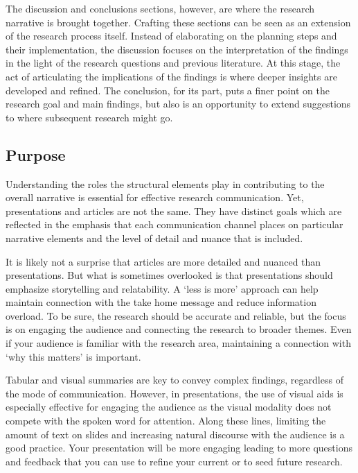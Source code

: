 \documentclass[
  letterpaper,
]{book}
\theoremstyle{definition}
\theoremstyle{remark}
\begin{document}
The discussion and conclusions sections, however, are where the research
narrative is brought together. Crafting these sections can be seen as an
extension of the research process itself. Instead of elaborating on the
planning steps and their implementation, the discussion focuses on the
interpretation of the findings in the light of the research questions
and previous literature. At this stage, the act of articulating the
implications of the findings is where deeper insights are developed and
refined. The conclusion, for its part, puts a finer point on the
research goal and main findings, but also is an opportunity to extend
suggestions to where subsequent research might go.

\subsection{Purpose}\label{sec-contribute-public-purpose}

Understanding the roles the structural elements play in contributing to
the overall narrative is essential for effective research communication.
Yet, presentations and articles are not the same. They have distinct
goals which are reflected in the emphasis that each communication
channel places on particular narrative elements and the level of detail
and nuance that is included.

It is likely not a surprise that articles are more detailed and nuanced
than presentations. But what is sometimes overlooked is that
presentations should emphasize storytelling and relatability. A `less is
more' approach can help maintain connection with the take home message
and reduce information overload. To be sure, the research should be
accurate and reliable, but the focus is on engaging the audience and
connecting the research to broader themes. Even if your audience is
familiar with the research area, maintaining a connection with `why this
matters' is important.

Tabular and visual summaries are key to convey complex findings,
regardless of the mode of communication. However, in presentations, the
use of visual aids is especially effective for engaging the audience as
the visual modality does not compete with the spoken word for attention.
Along these lines, limiting the amount of text on slides and increasing
natural discourse with the audience is a good practice. Your
presentation will be more engaging leading to more questions and
feedback that you can use to refine your current or to seed future
research.
\end{document}
